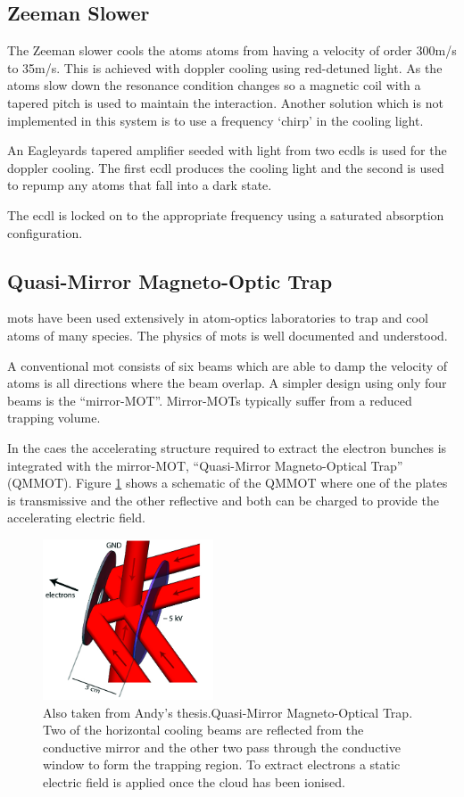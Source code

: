 \subsection{Zeeman Slower}
The Zeeman slower cools the atoms atoms from having a velocity of order 300m/s to 35m/s. This is achieved with doppler cooling using red-detuned light. As the atoms slow down the resonance condition changes so a magnetic coil with a tapered pitch is used to maintain the interaction. Another solution which is not implemented in this system is to use a frequency `chirp' in the cooling light.

An Eagleyards tapered amplifier seeded with light from two \glspl{ecdl} is used for the doppler cooling. The first \gls{ecdl} produces the cooling light and the second is used to repump any atoms that fall into a dark state.

The \gls{ecdl} is locked on to the appropriate frequency using a saturated absorption configuration\cite{maguire_theoretical_2006}.

\subsection{Quasi-Mirror Magneto-Optic Trap}
\glspl{mot} have been used extensively in atom-optics laboratories to trap and cool atoms of many species. The physics of \glspl{mot} is well documented and understood\cite{metcalf_laser_1999}.

A conventional \gls{mot} consists of six beams which are able to damp the velocity of atoms is all directions where the beam overlap. A simpler design using only four beams is the ``mirror-MOT''. Mirror-MOTs typically suffer from a reduced trapping volume\cite{reichel_atomic_1999}.

In the \gls{caes} the accelerating structure required to extract the electron bunches is integrated with the mirror-MOT, ``Quasi-Mirror Magneto-Optical Trap'' (QMMOT)\cite{hanssen_using_2006}. Figure \ref{fig:qmmot} shows a schematic of the QMMOT where one of the plates is transmissive and the other reflective and both can be charged to provide the accelerating electric field.

\begin{figure}[h]
\label{fig:qmmot}
\centering
\includegraphics[width=0.45\textwidth]{figs/qMMOT.jpg}
\caption{{\color{red}Also taken from Andy's thesis.}Quasi-Mirror Magneto-Optical Trap. Two of the horizontal cooling beams are reflected from the conductive mirror and the other two pass through the conductive window to form the trapping region. To extract electrons a static electric field is applied once the cloud has been ionised.}
\end{figure}

